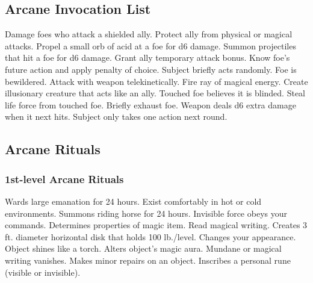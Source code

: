 \subsection{Arcane Invocation List}
\begin{swspelllist}
     Damage foes who attack a shielded ally.
     Protect ally from physical or magical attacks.
     Propel a small orb of acid at a foe for d6 damage.
     Summon projectiles that hit a foe for d6 damage.
     Grant ally temporary attack bonus.
     Know foe's future action and apply penalty of choice.
     Subject briefly acts randomly.
     Foe is bewildered.
     Attack with weapon telekinetically.
     Fire ray of magical energy.
     Create illusionary creature that acts like an ally.
     Touched foe believes it is blinded.
     Steal life force from touched foe.
     Briefly exhaust foe.
     Weapon deals d6 extra damage when it next hits.
     Subject only takes one action next round.
\end{swspelllist}

\subsection{Arcane Rituals}\label{Arcane Rituals}
\subsubsection{1st-level Arcane Rituals}
\begin{rituallist}
     Wards large emanation for 24 hours.
     Exist comfortably in hot or cold environments.
     Summons riding horse for 24 hours.
     Invisible force obeys your commands.
     Determines properties of magic item.
     Read magical writing.
     Creates 3 ft. diameter horizontal disk that holds 100 lb./level.
     Changes your appearance.
     Object shines like a torch.
     Alters object's magic aura.
     Mundane or magical writing vanishes.
     Makes minor repairs on an object.
     Inscribes a personal rune (visible or invisible).
\end{rituallist}

